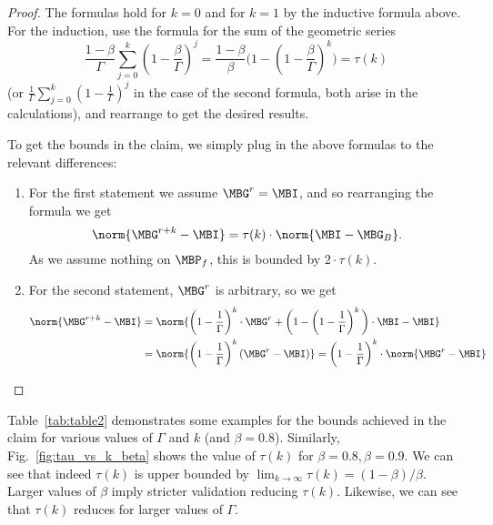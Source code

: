 \begin{proof}
		The formulas hold for $k=0$ and for $k=1$ by the inductive formula above. For the induction, use the formula for the sum of the geometric series 
		$$\frac{1-\beta}{\Gamma}\sum_{j=0}^k \left(1-\frac{\beta}{\Gamma}\right)^j=\frac{1-\beta}{\beta}\Bigg(1-\left(1-\frac{\beta}{\Gamma}\right)^k\Bigg)=\tau(k)$$
		(or $\frac{1}{\Gamma}\sum_{j=0}^k \left(1-\frac{1}{\Gamma}\right)^j$ in the case of the second formula, both arise in the calculations), and rearrange to get the desired results.
        
        To get the bounds in the claim, we simply plug in the above formulas to the relevant differences:
	\begin{enumerate}
		\item For the first statement we assume $\MBG^r=\MBI$, and so rearranging the formula we get
		$$\norm{\MBG^{r+k}-\MBI}=\tau(k)\cdot \norm{\MBI-\MBG_B}.$$
		As we assume nothing on $\MBP_f$, this is bounded by $2\cdot\tau(k)$.
		\item For the second statement, $\MBG^r$ is arbitrary, so we get 
			\begingroup\makeatletter\def\f@size{8}\check@mathfonts
\begin{align*}
				\norm{\MBG^{r+k}-\MBI} & =\norm{\left(1-\frac{1}{\Gamma}\right)^k\cdot \MBG^r +\bigg(1-\left(1-\frac{1}{\Gamma}\right)^k\bigg)\cdot \MBI-\MBI} \\
			& = \norm{\left(1-\frac{1}{\Gamma}\right)^k(\MBG^r-\MBI)} = \left(1-\frac{1}{\Gamma}\right)^k\cdot\norm{\MBG^r-\MBI}
			\end{align*}\endgroup
            
	\end{enumerate}
\end{proof}

Table~\ref{tab:table2} demonstrates some examples for the bounds achieved in the claim for various values of $\Gamma$ and $k$ (and $\beta=0.8$). Similarly, Fig.~\ref{fig:tau_vs_k_beta} shows the value of $\tau(k)$ for $\beta=0.8, \beta=0.9$. We can see that indeed $\tau(k)$ is upper bounded by $\lim_{k \to \infty}{\tau(k)} = (1-\beta) / \beta$. Larger values of $\beta$ imply stricter validation reducing $\tau(k)$.
Likewise, we can see that $\tau(k)$ reduces for larger values of $\Gamma$. 


